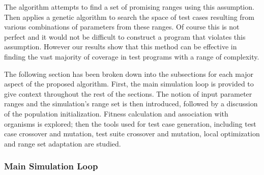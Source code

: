 \documentclass[runningheads]{llncs}
\begin{document}
The algorithm attempts to find a set of promising ranges using this assumption. Then applies a genetic algorithm to search the space of test cases resulting from various combinations of parameters from these ranges. Of course this is not perfect and it would not be difficult to construct a program that violates this assumption. However our results show that this method can be effective in finding the vast majority of coverage in test programs with a range of complexity.

The following section has been broken down into the subsections for each major aspect of the proposed algorithm. First, the main simulation loop is provided to give context throughout the rest of the sections. The notion of input parameter ranges and the simulation's range set is then introduced, followed by a discussion of the population initialization. Fitness calculation and association with organisms is explored; then the tools used for test case generation, including test case crossover and mutation, test suite crossover and mutation, local optimization and range set adaptation are studied.

\begin{comment}
Do you think this name is ok? I ask because techincally it shows both the initialization and the main loop. 
We could call it somthing like 'Algorithm Overview' or 'Simulation Algorithm'.

I dont know, I can't decide...
\end{comment}
\subsubsection{Main Simulation Loop}
\end{document}
